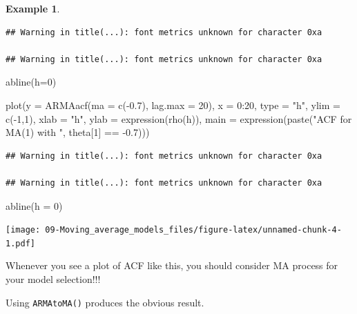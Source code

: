 \documentclass[
]{book}
\newenvironment{Shaded}{\begin{snugshade}}{\end{snugshade}}
\newcommand{\AttributeTok}[1]{\textcolor[rgb]{0.77,0.63,0.00}{#1}}
\newcommand{\DecValTok}[1]{\textcolor[rgb]{0.00,0.00,0.81}{#1}}
\newcommand{\FloatTok}[1]{\textcolor[rgb]{0.00,0.00,0.81}{#1}}
\newcommand{\FunctionTok}[1]{\textcolor[rgb]{0.00,0.00,0.00}{#1}}
\newcommand{\NormalTok}[1]{#1}
\newcommand{\SpecialCharTok}[1]{\textcolor[rgb]{0.00,0.00,0.00}{#1}}
\newcommand{\StringTok}[1]{\textcolor[rgb]{0.31,0.60,0.02}{#1}}
\theoremstyle{definition}
\theoremstyle{definition}
\newtheorem{example}{Example}[chapter]
\theoremstyle{definition}
\theoremstyle{definition}
\theoremstyle{remark}
\begin{document}
\begin{example}
\begin{verbatim}
## Warning in title(...): font metrics unknown for character 0xa

## Warning in title(...): font metrics unknown for character 0xa
\end{verbatim}

\begin{Shaded}
\begin{Highlighting}[]
\FunctionTok{abline}\NormalTok{(}\AttributeTok{h=}\DecValTok{0}\NormalTok{)}

\FunctionTok{plot}\NormalTok{(}\AttributeTok{y =} \FunctionTok{ARMAacf}\NormalTok{(}\AttributeTok{ma =} \FunctionTok{c}\NormalTok{(}\SpecialCharTok{{-}}\FloatTok{0.7}\NormalTok{), }\AttributeTok{lag.max =} \DecValTok{20}\NormalTok{), }\AttributeTok{x =} 
      \DecValTok{0}\SpecialCharTok{:}\DecValTok{20}\NormalTok{, }\AttributeTok{type =} \StringTok{"h"}\NormalTok{, }\AttributeTok{ylim =} \FunctionTok{c}\NormalTok{(}\SpecialCharTok{{-}}\DecValTok{1}\NormalTok{,}\DecValTok{1}\NormalTok{), }\AttributeTok{xlab =} \StringTok{"h"}\NormalTok{, }\AttributeTok{ylab =} 
      \FunctionTok{expression}\NormalTok{(}\FunctionTok{rho}\NormalTok{(h)), }\AttributeTok{main =} \FunctionTok{expression}\NormalTok{(}\FunctionTok{paste}\NormalTok{(}\StringTok{"ACF for }
\StringTok{      MA(1) with "}\NormalTok{, theta[}\DecValTok{1}\NormalTok{] }\SpecialCharTok{==} \SpecialCharTok{{-}}\FloatTok{0.7}\NormalTok{)))}
\end{Highlighting}
\end{Shaded}

\begin{verbatim}
## Warning in title(...): font metrics unknown for character 0xa

## Warning in title(...): font metrics unknown for character 0xa
\end{verbatim}

\begin{Shaded}
\begin{Highlighting}[]
\FunctionTok{abline}\NormalTok{(}\AttributeTok{h =} \DecValTok{0}\NormalTok{)}
\end{Highlighting}
\end{Shaded}

\texttt{[image: 09-Moving\_average\_models\_files/figure-latex/unnamed-chunk-4-1.pdf]}

Whenever you see a plot of ACF like this, you should consider MA process for your model selection!!!

Using \texttt{ARMAtoMA()} produces the obvious result.


\end{example}
\end{document}
